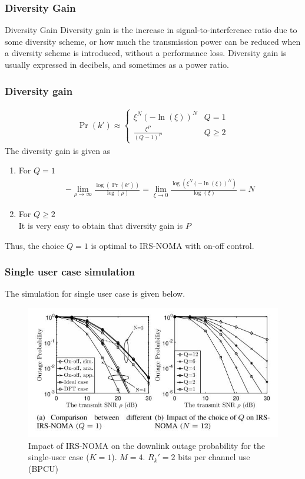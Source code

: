 \documentclass{beamer}
\providecommand{\pr}[1]{\ensuremath{\Pr\left(#1\right)}}
\providecommand{\brak}[1]{\ensuremath{\left(#1\right)}}
\begin{document}
\begin{frame}
\frametitle{Diversity Gain}
\begin{block}{Diversity Gain}
Diversity gain is the increase in signal-to-interference ratio due to some diversity scheme, or how much the transmission power can be reduced when a diversity scheme is introduced, without a performance loss. Diversity gain is usually expressed in decibels, and sometimes as a power ratio.
\end{block}
\end{frame}

\begin{frame}
\frametitle{Diversity gain}
\begin{align}
\pr{k'}\approx
\begin{cases}
\xi^N\brak{-\ln\brak{\xi}}^N& Q=1\\
\frac{\xi^P}{(Q-1)^P} & Q\geq 2
\end{cases}
\end{align}
The diversity gain is given as
\begin{enumerate}
\item For $Q=1$
\begin{align}
-\lim_{\rho\to\infty}\frac{\log\brak{\pr{k'}}}{\log\brak{\rho}}=\lim_{\xi\to 0}\frac{\log\brak{\xi^N(-\ln(\xi))^N}}{\log\brak{\xi}}=N
\end{align}
\item For $Q\geq 2$\\
It is very easy to obtain that diversity gain is $P$
\end{enumerate}
Thus, the choice $Q=1$ is optimal to IRS-NOMA with on-off control.
\end{frame}

\begin{frame}
\frametitle{Single user case simulation}
The simulation for single user case is given below.
\begin{figure}[H]
\centering
\includegraphics[width=.75\linewidth]{figure/snr_q}
\caption{Impact of IRS-NOMA on the downlink outage probability for the single-user case ($K=1$). $M=4$. $R_k'=2$ bits per channel use (BPCU)}
\label{fig:fig3}
\end{figure}
\end{frame}
\end{document}

